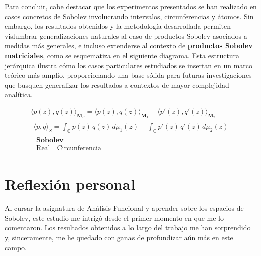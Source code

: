 Para concluir, cabe destacar que los experimentos presentados se han realizado en casos concretos de Sobolev involucrando intervalos, circunferencias y átomos. Sin embargo, los resultados obtenidos y la metodología desarrollada permiten vislumbrar generalizaciones naturales al caso de productos Sobolev asociados a medidas más generales, e incluso extenderse al contexto de \textbf{productos Sobolev matriciales}, como se esquematiza en el siguiente diagrama. Esta estructura jerárquica ilustra cómo los casos particulares estudiados se insertan en un marco teórico más amplio, proporcionando una base sólida para futuras investigaciones que busquen generalizar los resultados a contextos de mayor complejidad analítica.

\[
  \boxed{\!\!
    \begin{array}{c}
      \displaystyle
      \langle p(z),q(z)\rangle_{\textbf{M}_S}
      =\langle p(z),q(z)\rangle_{\textbf{M}_1}
      +\langle p'(z),q'(z)\rangle_{\textbf{M}_2}  %
      \\[6pt]                            %
      \boxed{\!\!
        \begin{array}{c}
          \displaystyle
          \langle p,q\rangle_{S}
          =\int_{\mathbb{C}} p(z)\,q(z)\,d\mu_1(z)
          +\int_{\mathbb{C}} p'(z)\,q'(z)\,d\mu_2(z)   %
          \\[6pt]
          \boxed{\!\!
            \begin{array}{c}
              \textbf{Sobolev} \\[4pt]
              \boxed{\text{Real}}\quad
              \boxed{\text{Circunferencia}}
            \end{array}
          }%
        \end{array}
      }%
    \end{array}
  }\!
\]

\section{Reflexión personal}

Al cursar la asignatura de Análisis Funcional y aprender sobre los espacios de Sobolev, este estudio me intrigó desde el primer momento en que me lo comentaron. Los resultados obtenidos a lo largo del trabajo me han sorprendido y, sinceramente, me he quedado con ganas de profundizar aún más en este campo.

